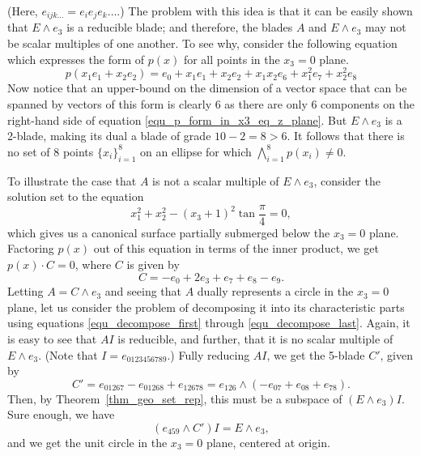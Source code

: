 \documentclass{birkjour}
\theoremstyle{definition}
\theoremstyle{remark}
\numberwithin{equation}{section}
\begin{document}
(Here, $e_{ijk\dots}=e_ie_je_k\dots$.)
The problem with this idea is that it can be easily shown that $E\wedge e_3$ is a reducible blade; and therefore,
the blades $A$ and $E\wedge e_3$ may not be scalar multiples of one another.
To see why, consider the following equation which expresses the form of $p(x)$ for all points in the $x_3=0$ plane.
\begin{equation}\label{equ_p_form_in_x3_eq_z_plane}
p(x_1e_1+x_2e_2)=e_0 + x_1e_1 + x_2e_2 + x_1x_2e_6 + x_1^2e_7 + x_2^2e_8
\end{equation}
Now notice that an upper-bound on the dimension of a vector space that can be spanned by vectors
of this form is clearly 6 as there are only 6 components on the right-hand side of equation \eqref{equ_p_form_in_x3_eq_z_plane}.
But $E\wedge e_3$ is a 2-blade, making its dual a blade of grade $10-2=8>6$.  It follows that there is no set of
8 points $\{x_i\}_{i=1}^8$ on an ellipse for which $\bigwedge_{i=1}^8 p(x_i)\neq 0$.

To illustrate the case that $A$ is not a scalar multiple of $E\wedge e_3$, consider the solution set
to the equation
\begin{equation}
x_1^2 + x_2^2 - (x_3+1)^2\tan\frac{\pi}{4}=0,
\end{equation}
which gives us a canonical surface partially submerged below the $x_3=0$ plane.
Factoring $p(x)$ out of this equation in terms of the inner product, we get $p(x)\cdot C=0$,
where $C$ is given by
\begin{equation}
C = -e_0 + 2e_3 + e_7 + e_8 - e_9.
\end{equation}
Letting $A=C\wedge e_3$ and seeing that $A$ dually represents a circle in the $x_3=0$ plane, let us consider
the problem of decomposing it into its characteristic parts using equations
\eqref{equ_decompose_first} through \eqref{equ_decompose_last}.
Again, it is easy to see that $AI$ is reducible, and further, that it is no scalar multiple of $E\wedge e_3$.
(Note that $I=e_{0123456789}$.)
Fully reducing $AI$, we get the 5-blade $C'$, given by
\begin{equation}
C' = e_{01267} - e_{01268} + e_{12678} = e_{126}\wedge(-e_{07} + e_{08} + e_{78}).
\end{equation}
Then, by Theorem~\ref{thm_geo_set_rep}, this must be a subspace of $(E\wedge e_3)I$.
Sure enough, we have
\begin{equation}
(e_{459}\wedge C')I = E\wedge e_3,
\end{equation}
and we get the unit circle in the $x_3=0$ plane, centered at origin.
\end{document}
